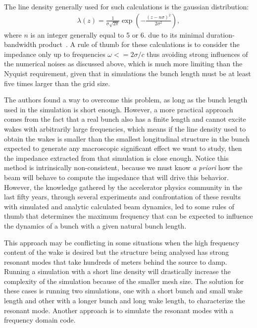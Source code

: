     The line density generally used for such calculations is the gaussian distribution:
    \begin{align}
        \lambda(z) = \frac{1}{\sigma\sqrt{2\pi}}
        \exp\left(-\frac{(z-n\sigma)^2}{2\sigma^2}\right),
    \end{align}
    where $n$ is an integer generally equal to 5 or 6.
    due to its minimal duration-bandwidth product~\cite{Niedermayer2016}. A rule of thumb for these calculations is to consider the impedance only up to frequencies $\omega<=2\sigma/c$ thus avoiding strong influences of the numerical noises as discussed above, which is much more limiting than the Nyquist requirement, given that in simulations the bunch length must be at least five times larger than the grid size.

    The authors  found a way to overcome this problem, as long as the bunch length used in the simulation is short enough. However, a more practical approach comes from the fact that a real bunch also has a finite length and cannot excite wakes with arbitrarily large frequencies, which means if the line density used to obtain the wakes is smaller than the smallest longitudinal structure in the bunch expected to generate any macroscopic significant effect we want to study, then the impedance extracted from that simulation is close enough. Notice this method is intrinsically non-consistent, because we must know \emph{a priori} how the beam will behave to compute the impedance that will drive this behavior. However, the knowledge gathered by the accelerator physics community in the last fifty years, through several experiments and confrontation of these results with simulated and analytic calculated beam dynamics, led to some rules of thumb that determines the maximum frequency that can be expected to influence the dynamics of a bunch with a given natural bunch length.

    This approach may be conflicting in some situations when the high frequency content of the wake is desired but the structure being analysed has strong resonant modes that take hundreds of meters behind the source to damp. Running a simulation with a short line density will drastically increase the complexity of the simulation because of the smaller mesh size. The solution for these cases is running two simulations, one with a short bunch and small wake length and other with a longer bunch and long wake length, to characterize the resonant mode. Another approach is to simulate the resonant modes with a frequency domain code.

